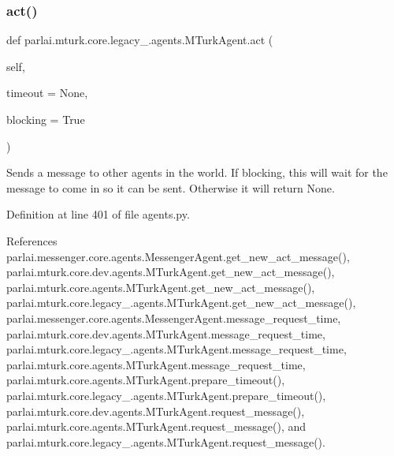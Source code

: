\subsubsection{\texorpdfstring{act()}{act()}}
{\footnotesize\ttfamily def parlai.\+mturk.\+core.\+legacy\+\_.\+agents.\+M\+Turk\+Agent.\+act (\begin{DoxyParamCaption}\item[{}]{self,  }\item[{}]{timeout = {\ttfamily None},  }\item[{}]{blocking = {\ttfamily True} }\end{DoxyParamCaption})}

\begin{DoxyVerb}Sends a message to other agents in the world. If blocking, this
will wait for the message to come in so it can be sent. Otherwise
it will return None.
\end{DoxyVerb}
 

Definition at line 401 of file agents.\+py.



References parlai.\+messenger.\+core.\+agents.\+Messenger\+Agent.\+get\+\_\+new\+\_\+act\+\_\+message(), parlai.\+mturk.\+core.\+dev.\+agents.\+M\+Turk\+Agent.\+get\+\_\+new\+\_\+act\+\_\+message(), parlai.\+mturk.\+core.\+agents.\+M\+Turk\+Agent.\+get\+\_\+new\+\_\+act\+\_\+message(), parlai.\+mturk.\+core.\+legacy\+\_.\+agents.\+M\+Turk\+Agent.\+get\+\_\+new\+\_\+act\+\_\+message(), parlai.\+messenger.\+core.\+agents.\+Messenger\+Agent.\+message\+\_\+request\+\_\+time, parlai.\+mturk.\+core.\+dev.\+agents.\+M\+Turk\+Agent.\+message\+\_\+request\+\_\+time, parlai.\+mturk.\+core.\+legacy\+\_.\+agents.\+M\+Turk\+Agent.\+message\+\_\+request\+\_\+time, parlai.\+mturk.\+core.\+agents.\+M\+Turk\+Agent.\+message\+\_\+request\+\_\+time, parlai.\+mturk.\+core.\+agents.\+M\+Turk\+Agent.\+prepare\+\_\+timeout(), parlai.\+mturk.\+core.\+legacy\+\_.\+agents.\+M\+Turk\+Agent.\+prepare\+\_\+timeout(), parlai.\+mturk.\+core.\+dev.\+agents.\+M\+Turk\+Agent.\+request\+\_\+message(), parlai.\+mturk.\+core.\+agents.\+M\+Turk\+Agent.\+request\+\_\+message(), and parlai.\+mturk.\+core.\+legacy\+\_.\+agents.\+M\+Turk\+Agent.\+request\+\_\+message().

